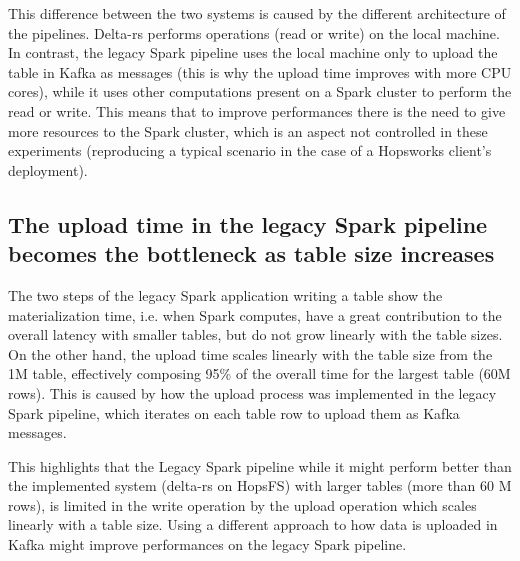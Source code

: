 This difference between the two systems is caused by the different architecture of the pipelines. Delta-rs performs operations (read or write) on the local machine. In contrast, the legacy Spark pipeline uses the local machine only to upload the table in Kafka as messages (this is why the upload time improves with more \gls{CPU} cores), while it uses other computations present on a Spark cluster to perform the read or write. This means that to improve performances there is the need to give more resources to the Spark cluster, which is an aspect not controlled in these experiments (reproducing a typical scenario in the case of a Hopsworks client's deployment). 

\subsection{The upload time in the legacy Spark pipeline becomes the bottleneck as table size increases}

The two steps of the legacy Spark application writing a table show the materialization time, i.e. when Spark computes, have a great contribution to the overall latency with smaller tables, but do not grow linearly with the table sizes. On the other hand, the upload time scales linearly with the table size from the 1M table, effectively composing 95\% of the overall time for the largest table (60M rows). This is caused by how the upload process was implemented in the legacy Spark pipeline, which iterates on each table row to upload them as Kafka messages. 

This highlights that the Legacy Spark pipeline while it might perform better than the implemented system (delta-rs on \gls{HopsFS}) with larger tables (more than 60 M rows), is limited in the write operation by the upload operation which scales linearly with a table size. Using a different approach to how data is uploaded in Kafka might improve performances on the legacy Spark pipeline.